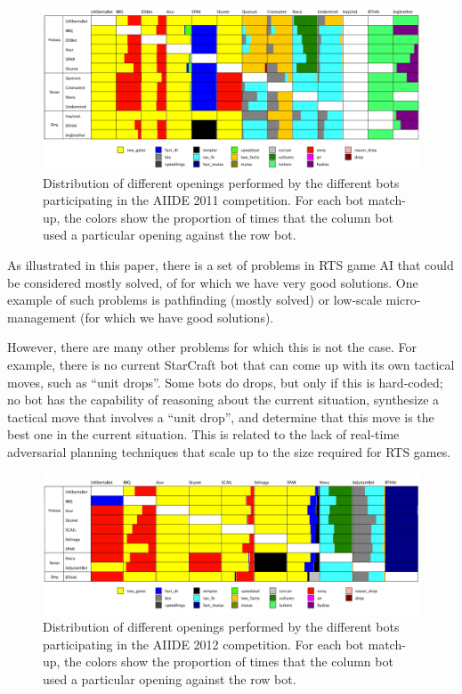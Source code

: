 \documentclass[journal]{IEEEtran}
\begin{document}
\begin{figure}[tb]
    \centering
    \includegraphics[width=\textwidth]{figures/botopenings.pdf}
    \caption{Distribution of different openings performed by the different bots participating in the AIIDE 2011 competition. For each bot match-up, the colors show the proportion of times that the column bot used a particular opening against the row bot.}
    \label{fig:aiide2011-botopenings}
\end{figure}


As illustrated in this paper, there is a set of problems in RTS game AI that could be considered mostly solved, of for which we have very good solutions. One example of such problems is pathfinding (mostly solved) or low-scale micro-management (for which we have good solutions). 

However, there are many other problems for which this is not the case. For example, there is no current StarCraft bot that can come up with its own tactical moves, such as ``unit drops''. Some bots do drops, but only if this is hard-coded; no bot has the capability of reasoning about the current situation, synthesize a tactical move that involves a ``unit drop'', and determine that this move is the best one in the current situation. This is related to the lack of real-time adversarial planning techniques that scale up to the size required for RTS games. 


\begin{figure}[tb]
    \centering
    \includegraphics[width=\textwidth]{figures/botopenings2012.pdf}
    \caption{Distribution of different openings performed by the different bots participating in the AIIDE 2012 competition. For each bot match-up, the colors show the proportion of times that the column bot used a particular opening against the row bot.}
    \label{fig:aiide2012-botopenings}
\end{figure}
\end{document}
